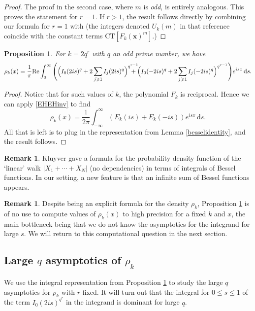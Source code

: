 \documentclass[12pt,reqno]{amsart}
\theoremstyle{definition}
\theoremstyle{plain}
\newtheorem{proposition}[theorem]{Proposition}
\theoremstyle{definition}
\newtheorem{remark}[theorem]{Remark}
\renewcommand{\geq}{\geqslant}
\renewcommand{\leq}{\leqslant}
\renewcommand{\Re}{\mathrm{Re}}
\renewcommand{\d}{\mathrm{d}}
\begin{document}
\begin{proof}
	The proof in the second case, where $m$ is \emph{odd}, is entirely analogous. This proves the statement for $r = 1$. If $r > 1$, the result follows directly by combining our formula for $r=1$ with \cite[Proposition~2.3]{Lala} (the integers denoted $U_k(m)$ in that reference coincide with the constant terms $\text{CT}[F_k(\textbf{x})^m]$.)
\end{proof}


\begin{proposition} \label{prop:gtrepr}
For $k=2q^r$ with $q$ an odd prime number, we have 
\begin{equation*} 
	\rho_k(x) =  \frac{1}{\pi} \Re \int_0^\infty \Bigg( \Big(I_0(2 i s)^q + 2\sum_{j \geq 1} I_{j}(2 i s)^q\Big)^{q^{r-1}} \hspace*{-5mm} +  \Big(I_0(-2 i s)^q + 2\sum_{j \geq 1} I_{j}(-2 i s)^q\Big)^{q^{r-1}}\Bigg) e^{isx} \, \d s. 
\end{equation*}    
\end{proposition} 

\begin{proof} Notice that for such values of $k$, the polynomial $F_k$ is reciprocal. Hence we can apply \eqref{EHEHinv} 
to find $$\rho_k(x) = \frac{1}{2 \pi} \int_{-\infty}^{\infty} (E_k(is) + E_{k}(-is)) e^{isx} \, \d s.$$ All that is left is to plug in the representation from Lemma 
\ref{besselidentity}, and the result follows. 
\end{proof} 

\begin{remark} \label{remkluif} 
Kluyver  \cite{kluyver1906local} gave a formula for the probability density function of the `linear' walk $|X_1 + \cdots + X_N|$ (no dependencies) in terms of integrals of Bessel functions. In our setting, a new feature is that an infinite sum of Bessel functions appears. 
\end{remark}

\begin{remark}
Despite being an explicit formula for the density $\rho_k$,  Proposition \ref{prop:gtrepr}  is of no use to compute values of $\rho_k(x)$ to high precision for a fixed $k$ and $x$, the main bottleneck being that we do not know the asymptotics for the integrand for large $s$. We will return to this computational question in the next section.  
\end{remark}

\subsection{Large $q$ asymptotics of $\rho_k$} We use the integral representation from Proposition \ref{prop:gtrepr} to study the large $q$ asymptotics for $\rho_k$ with $r$ fixed. It will turn out that the integral for $0 \leq s \leq 1$ of the term $I_0(2 i s)^{q^r}$ in the integrand is dominant for large $q$.
\end{document}
